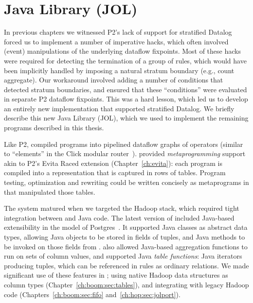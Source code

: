 \section{Java \OVERLOG Library (JOL)}
\label{ch:boom:sec:jol}

In previous chapters we witnessed P2's lack of support for stratified Datalog
forced us to implement a number of imperative hacks, which often involved
(event) manipulations of the underlying dataflow fixpoints.  Most of these
hacks were required for detecting the termination of a group of rules, which
would have been implicitly handled by imposing a natural stratum boundary
(e.g., count aggregate).  Our workaround involved adding a number of conditions
that detected stratum boundaries, and ensured that these ``conditions'' were
evaluated in separate P2 dataflow fixpoints.  This was a hard lesson, which led
us to develop an entirely new \OVERLOG implementation that supported stratified
Datalog.  We briefly describe this new Java \OVERLOG Library (JOL), which we
used to implement the remaining \OVERLOG programs described in this thesis.

Like P2, \JOL compiled \OVERLOG programs into pipelined dataflow graphs of
operators (similar to ``elements'' in the Click modular router~\cite{click}).
\JOL provided {\em metaprogramming} support akin to P2's Evita Raced extension
(Chapter~\ref{ch:evita}): each \OVERLOG program is compiled into a
representation that is captured in rows of tables.  Program testing,
optimization and rewriting could be written concisely as metaprograms in
\OVERLOG that manipulated those tables.

The \JOL system matured when we targeted the Hadoop stack, which required tight
integration between \OVERLOG and Java code.  The latest version of \JOL
included Java-based extensibility in the model of Postgres~\cite{postgres}.  It
supported Java classes as abstract data types, allowing Java objects to be
stored in fields of tuples, and Java methods to be invoked on those fields from
\OVERLOG.  \JOL also allowed Java-based aggregation functions to run on sets of
column values, and supported Java {\em table functions}: Java iterators
producing tuples, which can be referenced in \OVERLOG rules as ordinary
relations.  We made significant use of these features in \BOOMA; using native
Hadoop data structures as column types (Chapter~\ref{ch:boom:sec:tables}), and
integrating with legacy Hadoop code (Chapters~\ref{ch:boom:sec:fifo}
and~\ref{ch:hop:sec:jolport}).


